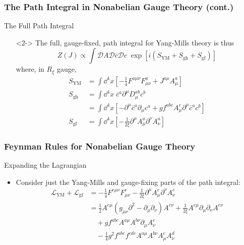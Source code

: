 \documentclass{beamer}
\begin{document}
\begin{frame}
    \frametitle{The Path Integral in Nonabelian Gauge Theory (cont.)}
    \alert{The Full Path Integral}
    \begin{itemize}
        \item[\textbullet]<2-> The full, gauge-fixed, path integral for Yang-Mills theory is thus \[ Z(J) \propto \int\mathcal{D}A\mathcal{D}\bar{c}\mathcal{D}c \; \exp[i(S_\text{YM} + S_\text{gh} + S_\text{gf})] \] where, in $R_\xi$ gauge, 
        \begin{align*}
            S_\text{YM} &= \int\dd^4x\left[-\frac{1}{4}F^{a\mu\nu}F_{\mu\nu}^a + J^{a\mu}A_\mu^a\right] \\
            S_\text{gh} &= \int\dd^4x \; \bar{c}^a\partial^\mu D_\mu^{ab}c^b \\
            &= \int\dd^4x\left[-\partial^\mu\bar{c}^a\partial_\mu c^a + gf^{abc}A_\mu^c\partial^\mu\bar{c}^ac^b\right] \\
            S_\text{gf} &= \int\dd^4x \left[-\frac{1}{2\xi}\partial^\mu A_\mu^a \partial^\nu A_\nu^a \right]
        \end{align*}
    \end{itemize}
\end{frame}

\begin{frame}
    \frametitle{Feynman Rules for Nonabelian Gauge Theory}
    \alert{Expanding the Lagrangian}
    \begin{itemize}
        \item<2-> Consider just the Yang-Mills and gauge-fixing parts of the path integral:
        \begin{align*}
            \mathcal{L}_\text{YM} + \mathcal{L}_\text{gf} &= -\frac{1}{4}F^{e\mu\nu}F_{\mu\nu}^e - \frac{1}{2\xi}\partial^\mu A_\mu^e \partial^\nu A_\nu^e \\
            &= \frac{1}{2}A^{e\mu}(g_{\mu\nu}\partial^2 - \partial_\mu \partial_\nu)A^{e\nu} + \frac{1}{2\xi}A^{e\mu}\partial_\mu\partial_\nu A^{e\nu} \\
            &\quad + gf^{abc}A^{a\mu}A^{b\nu}\partial_\mu A_\nu^c \\
            &\quad - \frac{1}{4}g^2f^{abe}f^{cde}A^{a\mu}A^{b\nu}A_\mu^c A_\nu^d
        \end{align*}
    \end{itemize}
\end{frame}
\end{document}
